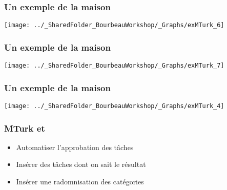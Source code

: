 \documentclass{beamer}
\begin{document}

  \begin{frame}
	        \frametitle{Un exemple de la maison} \vspace{1cm}   
	        \begin{center}
	           \texttt{[image: ../\_SharedFolder\_BourbeauWorkshop/\_Graphs/exMTurk\_6]}
	        \end{center}  
	    \end{frame}
    

  \begin{frame}
	        \frametitle{Un exemple de la maison} \vspace{1cm}   
	        \begin{center}
	           \texttt{[image: ../\_SharedFolder\_BourbeauWorkshop/\_Graphs/exMTurk\_7]}
	        \end{center}  
	    \end{frame}
    

     \begin{frame}
	        \frametitle{Un exemple de la maison} \vspace{1cm}   
	        \begin{center}
	           \texttt{[image: ../\_SharedFolder\_BourbeauWorkshop/\_Graphs/exMTurk\_4]}
	        \end{center}  
	    \end{frame}
	    
	   

    \begin{frame}
    
      \frametitle{MTurk et \R} \vspace{1cm}
      
       \begin{itemize}
          \item{Automatiser l'approbation des tâches}
          \item{Insérer des tâches dont on sait le résultat}
          \item{Insérer une radomnisation des catégories}
        \end{itemize}
         
    \end{frame}  
    
    
\end{document}

